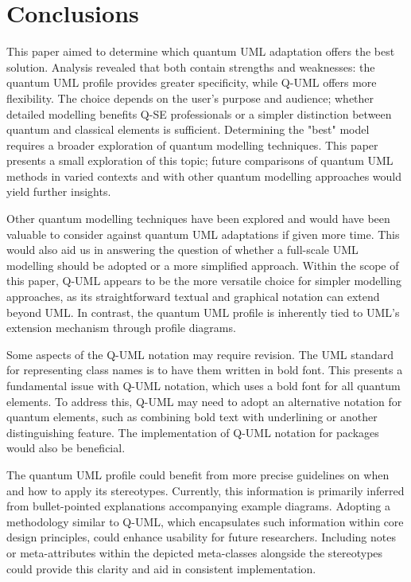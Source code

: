 \documentclass{article}
\begin{document}
\section{Conclusions}

This paper aimed to determine which quantum UML adaptation offers the best solution. Analysis revealed that both contain strengths and weaknesses: the quantum UML profile provides greater specificity, while Q-UML offers more flexibility. The choice depends on the user's purpose and audience; whether detailed modelling benefits Q-SE professionals or a simpler distinction between quantum and classical elements is sufficient. Determining the "best" model requires a broader exploration of quantum modelling techniques. This paper presents a small exploration of this topic; future comparisons of quantum UML methods in varied contexts and with other quantum modelling approaches would yield further insights.

Other quantum modelling techniques have been explored and would have been valuable to consider against quantum UML adaptations if given more time\cite{9233151}\cite{app132111794}\cite{exman2021quantumsoftwaremodelsdensity}\cite{KHAN2023111682}\cite{ZHAO2024107380}\cite{10.1145/3412451.3428499}. This would also aid us in answering the question of whether a full-scale UML modelling should be adopted or a more simplified approach. Within the scope of this paper, Q-UML appears to be the more versatile choice for simpler modelling approaches, as its straightforward textual and graphical notation can extend beyond UML. In contrast, the quantum UML profile is inherently tied to UML's extension mechanism through profile diagrams. 

Some aspects of the Q-UML notation may require revision. The UML standard for representing class names is to have them written in bold font\cite{Seidl_Scholz_Huemer_Kappel_Duffy_2014}. This presents a fundamental issue with Q-UML notation, which uses a bold font for all quantum elements. To address this, Q-UML may need to adopt an alternative notation for quantum elements, such as combining bold text with underlining or another distinguishing feature. The implementation of Q-UML notation for packages would also be beneficial. 

The quantum UML profile could benefit from more precise guidelines on when and how to apply its stereotypes. Currently, this information is primarily inferred from bullet-pointed explanations accompanying example diagrams. Adopting a methodology similar to Q-UML, which encapsulates such information within core design principles, could enhance usability for future researchers. Including notes or meta-attributes within the depicted meta-classes alongside the stereotypes could provide this clarity and aid in consistent implementation.
\end{document}
